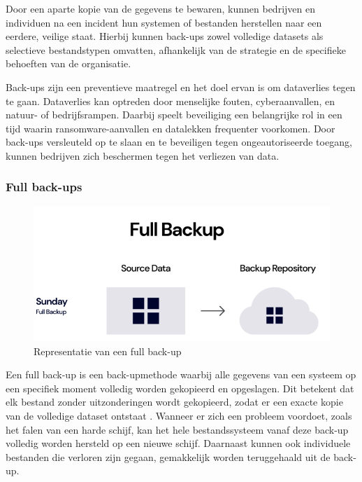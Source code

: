 Door een aparte kopie van de gegevens te bewaren, kunnen bedrijven en individuen na een incident hun systemen of bestanden herstellen naar een eerdere, veilige staat. Hierbij kunnen back-ups zowel volledige datasets als selectieve bestandstypen omvatten, afhankelijk van de strategie en de specifieke behoeften van de organisatie. 

Back-ups zijn een preventieve maatregel en het doel ervan is om dataverlies tegen te gaan. Dataverlies kan optreden door menselijke fouten, cyberaanvallen, en natuur- of bedrijfsrampen. Daarbij speelt beveiliging een belangrijke rol in een tijd waarin ransomware-aanvallen en datalekken frequenter voorkomen. Door back-ups versleuteld op te slaan en te beveiligen tegen ongeautoriseerde toegang, kunnen bedrijven zich beschermen tegen het verliezen van data. 

\subsubsection{Full back-ups}
\begin{figure}[h] 
    \centering
    \captionsetup{justification=centering}
    \includegraphics[width=\textwidth]{img/fullb.png}  
    \caption{Representatie van een full back-up \autocite{Rivas2022}}   
    \label{fig:fullback-up}           
\end{figure}
Een full back-up is een back-upmethode waarbij alle gegevens van een systeem op een specifiek moment volledig worden gekopieerd en opgeslagen. \newpage Dit betekent dat elk bestand zonder uitzonderingen wordt gekopieerd, zodat er een exacte kopie van de volledige dataset ontstaat \autocite{Beard2018}. Wanneer er zich een probleem voordoet, zoals het falen van een harde schijf, kan het hele bestandssysteem vanaf deze back-up volledig worden hersteld op een nieuwe schijf. Daarnaast kunnen ook individuele bestanden die verloren zijn gegaan, gemakkelijk worden teruggehaald uit de back-up. 

